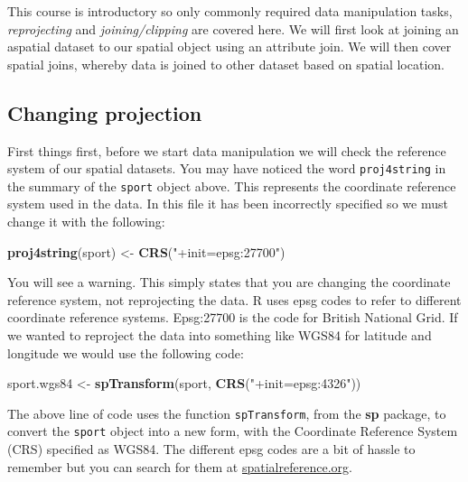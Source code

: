 \documentclass[]{article}
\newenvironment{Shaded}{}{}
\newcommand{\KeywordTok}[1]{\textcolor[rgb]{0.00,0.44,0.13}{\textbf{{#1}}}}
\newcommand{\StringTok}[1]{\textcolor[rgb]{0.25,0.44,0.63}{{#1}}}
\newcommand{\NormalTok}[1]{{#1}}
\begin{document}
This course is introductory so only commonly required data manipulation
tasks, \emph{reprojecting} and \emph{joining/clipping} are covered here.
We will first look at joining an aspatial dataset to our spatial object
using an attribute join. We will then cover spatial joins, whereby data
is joined to other dataset based on spatial location.

\subsection{Changing projection}\label{changing-projection}

First things first, before we start data manipulation we will check the
reference system of our spatial datasets. You may have noticed the word
\texttt{proj4string} in the summary of the \texttt{sport} object above.
This represents the coordinate reference system used in the data. In
this file it has been incorrectly specified so we must change it with
the following:

\begin{Shaded}
\begin{Highlighting}[]
\KeywordTok{proj4string}\NormalTok{(sport) <-}\StringTok{ }\KeywordTok{CRS}\NormalTok{(}\StringTok{"+init=epsg:27700"}\NormalTok{)}
\end{Highlighting}
\end{Shaded}

You will see a warning. This simply states that you are changing the
coordinate reference system, not reprojecting the data. R uses epsg
codes to refer to different coordinate reference systems. Epsg:27700 is
the code for British National Grid. If we wanted to reproject the data
into something like WGS84 for latitude and longitude we would use the
following code:

\begin{Shaded}
\begin{Highlighting}[]
\NormalTok{sport.wgs84 <-}\StringTok{ }\KeywordTok{spTransform}\NormalTok{(sport, }\KeywordTok{CRS}\NormalTok{(}\StringTok{"+init=epsg:4326"}\NormalTok{))}
\end{Highlighting}
\end{Shaded}

The above line of code uses the function \texttt{spTransform}, from the
\textbf{sp} package, to convert the \texttt{sport} object into a new
form, with the Coordinate Reference System (CRS) specified as WGS84. The
different epsg codes are a bit of hassle to remember but you can search
for them at \href{http://spatialreference.org/}{spatialreference.org}.
\end{document}
